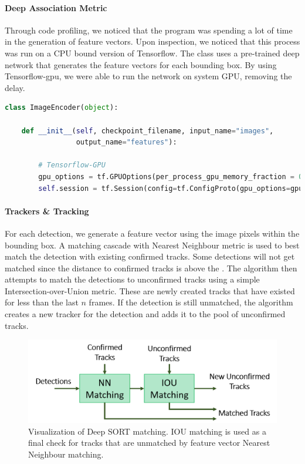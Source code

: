 \paragraph{Deep Association Metric} Through code profiling, we noticed that the program was spending a lot of time in the generation of feature vectors. Upon inspection, we noticed that this process was run on a CPU bound version of Tensorflow. The  class uses a pre-trained deep network that generates the feature vectors for each bounding box. By using Tensorflow-gpu, we were able to run the network on system GPU, removing the delay. \\

\begin{lstlisting}[language=Python, caption={Deep SORT Tensorflow GPU modifications}]
class ImageEncoder(object):

	def __init__(self, checkpoint_filename, input_name="images",
				 output_name="features"):
				 
        # Tensorflow-GPU
        gpu_options = tf.GPUOptions(per_process_gpu_memory_fraction = 0.2)
        self.session = tf.Session(config=tf.ConfigProto(gpu_options=gpu_options))
\end{lstlisting}



\paragraph{Trackers \& Tracking} For each detection, we generate a feature vector using the image pixels within the bounding box. A matching cascade with Nearest Neighbour metric is used to best match the detection with existing confirmed tracks. Some detections will not get matched since the distance to confirmed tracks is above the . The algorithm then attempts to match the detections to unconfirmed tracks using a simple Intersection-over-Union metric. These are newly created tracks that have existed for less than the last $n$ frames. If the detection is still unmatched, the algorithm creates a new tracker for the detection and adds it to the pool of unconfirmed tracks.

\begin{figure}[ht]
	\centering
	\includegraphics[width=0.8\linewidth]{img/chapter5_implementation/deepSortMatching.png}
	\caption{Visualization of Deep SORT matching. IOU matching is used as a final check for tracks that are unmatched by feature vector Nearest Neighbour matching.}
	\label{fig:deepSortMatch}
\end{figure}

